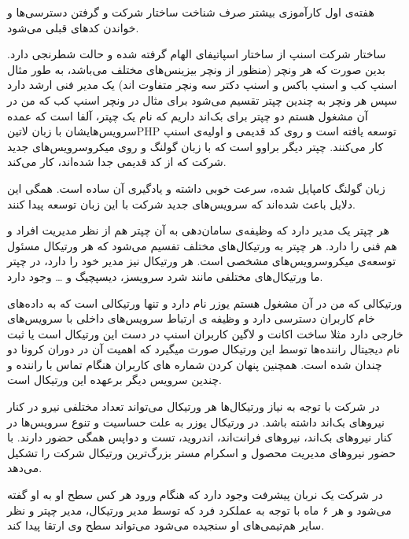 \documentclass[a4]{report}
\begin{document}

هفته‌ی اول کارآموزی بیشتر صرف شناخت ساختار شرکت و گرفتن دسترسی‌ها و خواندن کدهای قبلی می‌شود.

ساختار شرکت اسنپ از ساختار اسپاتیفای الهام گرفته شده و حالت شطرنجی دارد.
بدین صورت که هر ونچر (منظور از ونچر بیزینس‌های مختلف می‌باشد،
به طور مثال اسنپ کب و اسنپ باکس و اسنپ دکتر سه ونچر متفاوت اند)
یک مدیر فنی ارشد دارد سپس هر ونچر به چندین چپتر تقسیم می‌شود برای مثال در ونچر اسنپ کب که من در آن مشغول هستم
دو چپتر برای بک‌اند داریم که نام یک چپتر، آلفا است که عمده سرویس‌هایشان با زبان ‌لاتین{PHP} توسعه یافته است و روی کد قدیمی و اولیه‌ی اسنپ کار می‌کنند.
چپتر دیگر براوو است که با زبان گولنگ و روی میکروسرویس‌های جدید شرکت که از کد قدیمی جدا شده‌اند، کار می‌کند.

زبان گولنگ کامپایل شده، سرعت خوبی داشته و یادگیری آن ساده است. همگی این دلایل باعث شده‌اند که سرویس‌های جدید شرکت با این زبان توسعه پیدا کنند.

هر چپتر یک مدیر دارد که وظیفه‌ی سامان‌دهی به آن چپتر هم از نظر مدیریت افراد و هم فنی را دارد.
هر چپتر به ورتیکال‌های مختلف تفسیم می‌شود که هر ورتیکال مسئول توسعه‌ی میکروسرویس‌های مشخصی است.
هر ورتیکال نیز مدیر خود را دارد، در چپتر ما ورتیکال‌های مختلفی مانند شرد سرویسز، دیسپچیگ و … وجود دارد.

ورتیکالی که من در آن مشغول هستم یوزر نام دارد و تنها ورتیکالی است که به داده‌های خام کاربران دسترسی دارد و وظیفه ی ارتباط سرویس‌های داخلی
با سرویس‌های خارجی دارد مثلا ساخت اکانت و لاگین کاربران اسنپ در دست این ورتیکال است
یا ثبت نام دیجیتال راننده‌ها توسط این ورتیکال صورت میگیرد که اهمیت آن در دوران کرونا دو چندان شده است.
همچنین پنهان کردن شماره های کاربران هنگام تماس با راننده و چندین سرویس دیگر برعهده این ورتیکال است.

در شرکت با توجه به نیاز ورتیکال‌ها هر ورتیکال می‌تواند تعداد مختلفی نیرو در کنار نیروهای بک‌اند داشته باشد.
در ورتیکال یوزر به علت حساسیت و تنوع سرویس‌ها در کنار نیروهای بک‌اند،
نیروهای فرانت‌اند، اندروید، تست و دواپس همگی حضور دارند.
با حضور نیروهای مدیریت محصول و اسکرام مستر بزرگ‌ترین ورتیکال شرکت را تشکیل می‌دهد.

در شرکت یک نربان پیشرفت وجود دارد که هنگام ورود هر کس سطح او به او گفته می‌شود و هر ۶ ماه با توجه به عملکرد فرد که توسط مدیر ورتیکال، مدیر چپتر
و نظر سایر هم‌تیمی‌های او سنجیده می‌شود می‌تواند سطح وی ارتقا پیدا کند.
\end{document}
